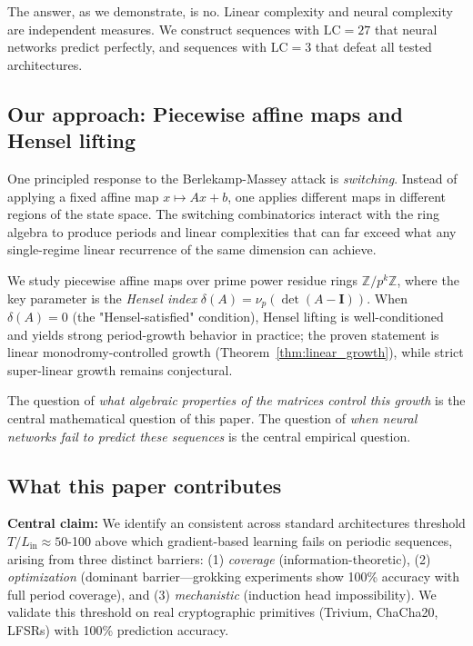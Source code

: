 \documentclass[11pt]{article}
\theoremstyle{plain}
\theoremstyle{definition}
\newcommand{\Z}{\mathbb{Z}}
\newcommand{\vp}{\nu_p}
\newcommand{\Id}{\mathbf{I}}
\newcommand{\LC}{\mathrm{LC}}
\begin{document}
The answer, as we demonstrate, is no. Linear complexity and neural complexity are independent measures. We construct sequences with $\LC = 27$ that neural networks predict perfectly, and sequences with $\LC = 3$ that defeat all tested architectures.

\subsection{Our approach: Piecewise affine maps and Hensel lifting}

One principled response to the Berlekamp-Massey attack is \emph{switching}. Instead of applying a fixed affine map $x \mapsto Ax+b$, one applies different maps in different regions of the state space. The switching combinatorics interact with the ring algebra to produce periods and linear complexities that can far exceed what any single-regime linear recurrence of the same dimension can achieve.

We study piecewise affine maps over prime power residue rings $\Z/p^k\Z$, where the key parameter is the \emph{Hensel index} $\delta(A) = \vp(\det(A - \Id))$. When $\delta(A) = 0$ (the "Hensel-satisfied" condition), Hensel lifting is well-conditioned and yields strong period-growth behavior in practice; the proven statement is linear monodromy-controlled growth (Theorem~\ref{thm:linear_growth}), while strict super-linear growth remains conjectural.

The question of \emph{what algebraic properties of the matrices control this growth} is the central mathematical question of this paper. The question of \emph{when neural networks fail to predict these sequences} is the central empirical question.

\subsection{What this paper contributes}

\textbf{Central claim:} We identify an consistent across standard architectures threshold $T/L_{\mathrm{in}} \approx 50$-100 above which gradient-based learning fails on periodic sequences, arising from three distinct barriers: (1) \emph{coverage} (information-theoretic), (2) \emph{optimization} (dominant barrier—grokking experiments show 100\% accuracy with full period coverage), and (3) \emph{mechanistic} (induction head impossibility). We validate this threshold on real cryptographic primitives (Trivium, ChaCha20, LFSRs) with 100\% prediction accuracy.
\end{document}
